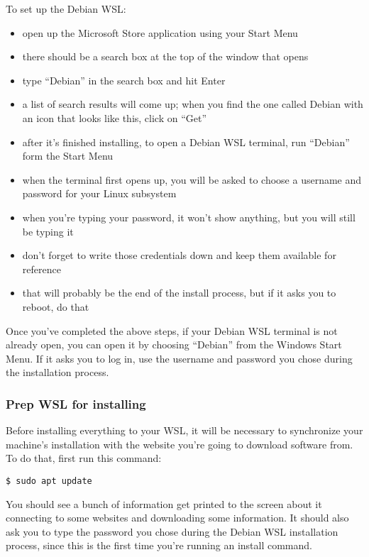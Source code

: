 \documentclass[11pt]{article}
\begin{document}
To set up the Debian WSL:

\begin{itemize}
\item open up the Microsoft Store application using your Start Menu
\item there should be a search box at the top of the window that opens
\item type ``Debian'' in the search box and hit Enter
\end{itemize}

\begin{itemize}
\item a list of search results will come up; when you find the one
called Debian with an icon that looks like this, click on ``Get''
\item after it's finished installing, to open a Debian WSL terminal, run
``Debian'' form the Start Menu
\item when the terminal first opens up, you will be asked to choose a
username and password for your Linux subsystem
\item when you're typing your password, it won't show anything, but you
will still be typing it
\item don't forget to write those credentials down and keep them available
for reference
\item that will probably be the end of the install process, but if it asks
you to reboot, do that
\end{itemize}

Once you've completed the above steps, if your Debian WSL terminal is
not already open, you can open it by choosing ``Debian'' from the
Windows Start Menu.  If it asks you to log in, use the username and
password you chose during the installation process.

\subsubsection{Prep WSL for installing}
\label{sec:orgaace96f}

Before installing everything to your WSL, it will be necessary to
synchronize your machine's installation with the website you're going
to download software from.  To do that, first run this command:

\begin{verbatim}
$ sudo apt update
\end{verbatim}

You should see a bunch of information get printed to the screen about
it connecting to some websites and downloading some information.  It
should also ask you to type the password you chose during the Debian
WSL installation process, since this is the first time you're running
an install command.
\end{document}

